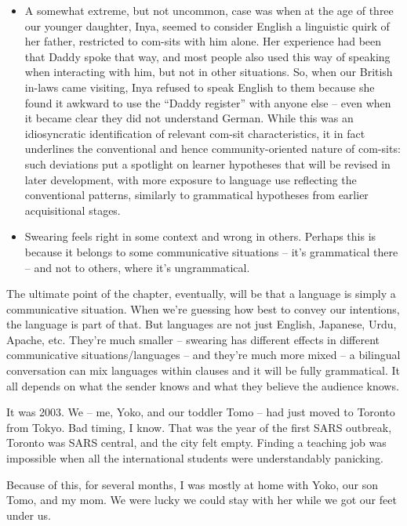 \begin{itemize}
    \item A somewhat extreme, but not uncommon, case was when at the age of three our younger daughter, Inya, seemed to consider English a linguistic quirk of her father, restricted to com-sits with him alone. Her experience had been that Daddy spoke that way, and most people also used this way of speaking when interacting with him, but not in other situations. So, when our British in-laws came visiting, Inya refused to speak English to them because she found it awkward to use the ``Daddy register'' with anyone else -- even when it became clear they did not understand German. While this was an idiosyncratic identification of relevant com-sit characteristics, it in fact underlines the conventional and hence community-oriented nature of com-sits: such deviations put a spotlight on learner hypotheses that will be revised in later development, with more exposure to language use reflecting the conventional patterns, similarly to grammatical hypotheses from earlier acquisitional stages. \hfill\citep[42--43]{Wiese2023}
    \item Swearing feels right in some context and wrong in others. Perhaps this is because it belongs to some communicative situations -- it's grammatical there -- and not to others, where it's ungrammatical.
\end{itemize}






The ultimate point of the chapter, eventually, will be that a language is simply a communicative situation. When we're guessing how best to convey our intentions, the language is part of that. But languages are not just English, Japanese, Urdu, Apache, etc. They're much smaller -- swearing has different effects in different communicative situations/languages -- and they're much more mixed -- a bilingual conversation can mix languages within clauses and it will be fully grammatical. It all depends on what the sender knows and what they believe the audience knows.

It was 2003. We -- me, Yoko, and our toddler Tomo -- had just moved to Toronto from Tokyo. Bad timing, I know. That was the year of the first SARS outbreak, Toronto was SARS central, and  the city felt empty. Finding a teaching job was impossible when all the international students were understandably panicking.

Because of this, for several months, I was mostly at home with Yoko, our son Tomo, and my mom. We were lucky we could stay with her while we got our feet under us.

